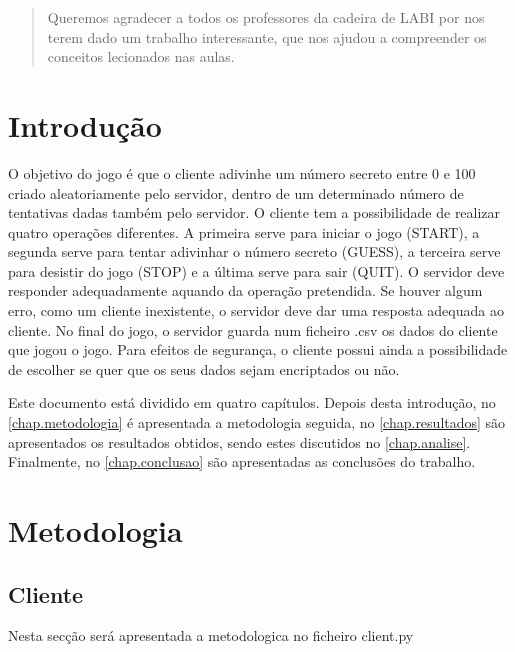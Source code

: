 \documentclass{report}
\begin{document}
\renewcommand{\abstractname}{Agradecimentos}
\begin{abstract}
Queremos agradecer a todos os professores da cadeira de LABI por nos terem dado um trabalho interessante, que nos ajudou a
compreender os conceitos lecionados nas aulas.

\end{abstract}


\tableofcontents


\clearpage
{}

\chapter{Introdução}
\label{chap.introducao}

O objetivo do jogo é que o cliente adivinhe um número secreto entre 0 e 100 criado 
aleatoriamente pelo servidor, dentro de um determinado número de tentativas dadas também
pelo servidor. O cliente tem a possibilidade de realizar quatro operações diferentes. A primeira
serve para iniciar o jogo (START), a segunda serve para tentar adivinhar o número secreto (GUESS), 
a terceira serve para desistir do jogo (STOP) e a última serve para sair (QUIT). O servidor deve responder
adequadamente aquando da operação pretendida. Se houver algum erro, como um cliente inexistente, o 
servidor deve dar uma resposta adequada ao cliente. No final do jogo, o servidor guarda num ficheiro
.csv os dados do cliente que jogou o jogo. Para efeitos de segurança, o cliente possui ainda a
possibilidade de escolher se quer que os seus dados sejam encriptados ou não.

Este documento está dividido em quatro capítulos.
Depois desta introdução,
no \autoref{chap.metodologia} é apresentada a metodologia seguida,
no \autoref{chap.resultados} são apresentados os resultados obtidos,
sendo estes discutidos no \autoref{chap.analise}.
Finalmente, no \autoref{chap.conclusao} são apresentadas
as conclusões do trabalho.


\chapter{Metodologia}
\label{chap.metodologia}
\section{Cliente}
Nesta secção será apresentada a metodologica no ficheiro client.py
\end{document}
